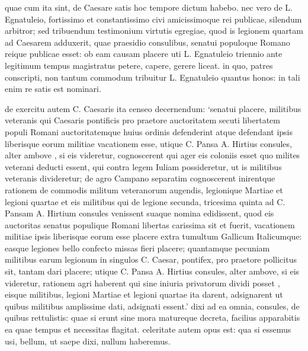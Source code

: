  quae cum ita sint, de Caesare satis hoc tempore dictum habebo. nec vero de L. Egnatuleio, fortissimo et constantissimo civi amicissimoque rei publicae, silendum arbitror; sed tribuendum testimonium virtutis egregiae, quod is legionem quartam ad Caesarem adduxerit, quae praesidio consulibus, senatui populoque Romano reique publicae esset: ob eam causam placere uti L. Egnatuleio triennio ante legitimum tempus magistratus petere, capere, gerere liceat. in quo, patres conscripti, non tantum commodum tribuitur L. Egnatuleio quantus honos: in tali enim re satis est nominari.

 de exercitu autem C. Caesaris ita censeo decernendum: `senatui placere, militibus veteranis qui Caesaris pontificis pro praetore auctoritatem secuti libertatem populi Romani auctoritatemque huius ordinis defenderint atque defendant ipsis liberisque eorum militiae vacationem esse, utique C. Pansa A. Hirtius consules, alter ambove , si eis videretur, cognoscerent qui ager eis coloniis esset quo milites veterani deducti essent, qui contra legem Iuliam possideretur, ut is militibus veteranis divideretur; de agro Campano separatim cognoscerent inirentque rationem de commodis militum veteranorum augendis, legionique Martiae et legioni quartae et eis militibus qui de legione secunda, tricesima quinta ad C. Pansam A. Hirtium consules venissent suaque nomina edidissent, quod eis auctoritas senatus populique Romani libertas carissima sit et fuerit, vacationem militiae ipsis liberisque eorum esse placere extra tumultum Gallicum Italicumque: easque legiones bello confecto missas fieri placere; quantamque pecuniam militibus earum legionum in singulos C. Caesar, pontifex, pro praetore pollicitus sit, tantam dari placere; utique C. Pansa A. Hirtius consules, alter ambove, si eis videretur, rationem agri haberent qui sine iniuria privatorum dividi posset , eisque militibus, legioni Martiae et legioni quartae ita darent, adsignarent ut quibus militibus amplissime dati, adsignati essent.' dixi ad ea omnia, consules, de quibus rettulistis: quae si erunt sine mora matureque decreta, facilius apparabitis ea quae tempus et necessitas flagitat. celeritate autem opus est: qua si essemus usi, bellum, ut saepe dixi, nullum haberemus.
